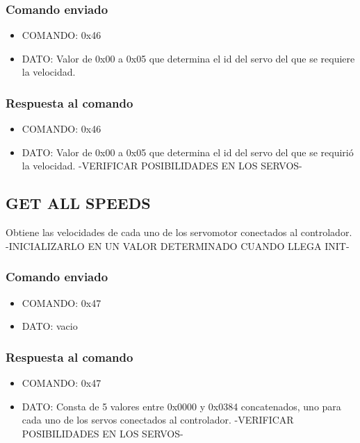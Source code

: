\documentclass[a4paper,10pt]{article}
\begin{document}
\subsubsection*{Comando enviado}

\begin{itemize}
	\item{COMANDO:} 0x46
	\item{DATO:} Valor de 0x00 a 0x05 que determina el id del servo del que se requiere la velocidad.
\end{itemize}

\subsubsection*{Respuesta al comando}

\begin{itemize}
	\item{COMANDO:} 0x46
	\item{DATO:} Valor de 0x00 a 0x05 que determina el id del servo del que se requiri\'o la velocidad.
	-VERIFICAR POSIBILIDADES EN LOS SERVOS-
\end{itemize}

\subsection{GET ALL SPEEDS}
\label{get_all_speeds}

Obtiene las velocidades de cada uno de los servomotor conectados al controlador. -INICIALIZARLO EN UN VALOR DETERMINADO CUANDO LLEGA INIT-

\subsubsection*{Comando enviado}

\begin{itemize}
	\item{COMANDO:} 0x47
	\item{DATO:} vacio
\end{itemize}

\subsubsection*{Respuesta al comando}

\begin{itemize}
	\item{COMANDO:} 0x47
	\item{DATO:} Consta de 5 valores entre 0x0000 y 0x0384 concatenados, uno para cada uno de los servos conectados al controlador.
	-VERIFICAR POSIBILIDADES EN LOS SERVOS-
\end{itemize}
\end{document}

